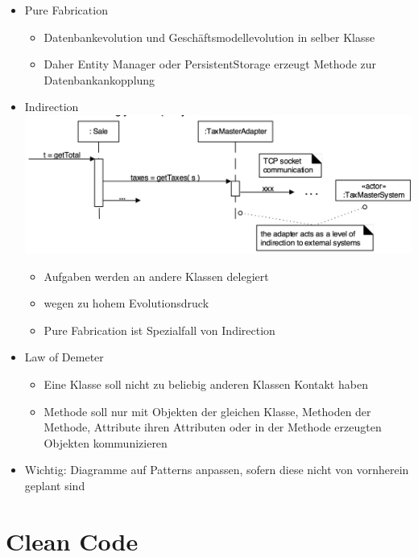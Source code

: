 \documentclass[paper=a4, fontsize=11pt]{scrartcl} %
\numberwithin{equation}{section} %
\numberwithin{figure}{section} %
\numberwithin{table}{section} %
\begin{document}
\begin{itemize}
\begin{itemize}
    \item Pure Fabrication
    \begin{itemize}
      \item Datenbankevolution und Geschäftsmodellevolution in selber Klasse
      \item Daher Entity Manager oder PersistentStorage erzeugt Methode zur Datenbankankopplung
    \end{itemize}
    \item Indirection\\
    \includegraphics[width=.7\textwidth]{imgs/indirection}
    \begin{itemize}
      \item Aufgaben werden an andere Klassen delegiert
      \item wegen zu hohem Evolutionsdruck
      \item Pure Fabrication ist Spezialfall von Indirection
    \end{itemize}
    \item Law of Demeter
    \begin{itemize}
      \item Eine Klasse soll nicht zu beliebig anderen Klassen Kontakt haben
      \item Methode soll nur mit Objekten der gleichen Klasse, Methoden der Methode, Attribute ihren Attributen oder in der Methode erzeugten Objekten kommunizieren
    \end{itemize}
    \item Wichtig: Diagramme auf Patterns anpassen, sofern diese nicht von vornherein geplant sind
  \end{itemize}
\end{itemize}

\section{Clean Code}
\end{document}
